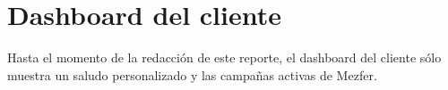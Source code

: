 \section{Dashboard del cliente}
Hasta el momento de la redacción de este reporte, el dashboard del cliente sólo muestra un saludo personalizado y las campañas activas de Mezfer.
    
    